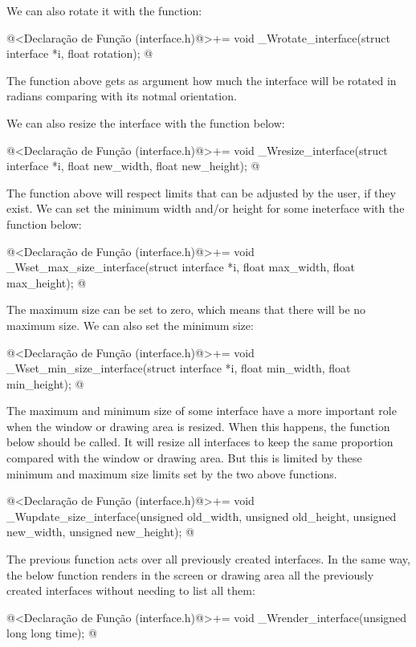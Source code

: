We can also rotate it with the function:

\iniciocodigo
@<Declaração de Função (interface.h)@>+=
void _Wrotate_interface(struct interface *i, float rotation);
@
\fimcodigo

The function above gets as argument how much the interface will be
rotated in radians comparing with its notmal orientation.

We can also resize the interface with the function below:

\iniciocodigo
@<Declaração de Função (interface.h)@>+=
void _Wresize_interface(struct interface *i, float new_width, float new_height);
@
\fimcodigo

The function above will respect limits that can be adjusted by the
user, if they exist. We can set the minimum width and/or height for
some ineterface with the function below:

\iniciocodigo
@<Declaração de Função (interface.h)@>+=
void _Wset_max_size_interface(struct interface *i, float max_width,
                              float max_height);
@
\fimcodigo

The maximum size can be set to zero, which means that there will be no
maximum size. We can also set the minimum size:

\iniciocodigo
@<Declaração de Função (interface.h)@>+=
void _Wset_min_size_interface(struct interface *i, float min_width,
                              float min_height);
@
\fimcodigo

The maximum and minimum size of some interface have a more important
role when the window or drawing area is resized. When this happens,
the function below should be called. It will resize all interfaces to
keep the same proportion compared with the window or drawing area. But
this is limited by these minimum and maximum size limits set by the
two above functions.

\iniciocodigo
@<Declaração de Função (interface.h)@>+=
void _Wupdate_size_interface(unsigned old_width, unsigned old_height,
                             unsigned new_width, unsigned new_height);
@
\fimcodigo

The previous function acts over all previously created interfaces. In
the same way, the below function renders in the screen or drawing area
all the previously created interfaces without needing to list all
them:

\iniciocodigo
@<Declaração de Função (interface.h)@>+=
void _Wrender_interface(unsigned long long time);
@
\fimcodigo


